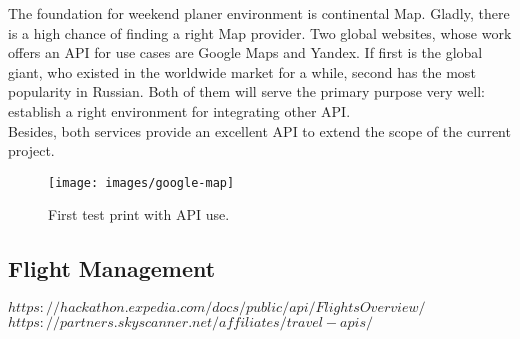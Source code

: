 \documentclass[12pt]{article}
\numberwithin{equation}{section} %
\numberwithin{figure}{section} %
\numberwithin{table}{section} %
\begin{document}
		The foundation for weekend planer environment is continental Map. Gladly, there is a high chance of finding a right Map provider. Two global websites, whose work offers an API for use cases are Google Maps and Yandex. If first is the global giant, who existed in the worldwide market for a while, second has the most popularity in Russian. Both of them will serve the primary purpose very well: establish a right environment for integrating other API. \\
		Besides, both services provide an excellent API to extend the scope of the current project. \\
		
		\begin{figure}[H]
			\centering        
			\texttt{[image: images/google-map]}
			\caption{First test print with API use.}
			\label{fig:gmaps}
		\end{figure}
	
%
	\subsection{Flight Management}
		$ https://hackathon.expedia.com/docs/public/api/Flights Overview/ $ \\
		$ https://partners.skyscanner.net/affiliates/travel-apis/ $ \\		
		
\end{document}
